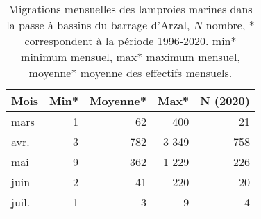 \begin{table}[htbp]
\centering
\begin{tabular}{lrrrr}
  \hline
Mois & Min* & Moyenne* & Max* & N (2020) \\ 
  \hline
mars & 1 & 62 & 400 & 21 \\ 
  avr. & 3 & 782 & 3 349 & 758 \\ 
  mai & 9 & 362 & 1 229 & 226 \\ 
  juin & 2 & 41 & 220 & 20 \\ 
  juil. & 1 & 3 & 9 & 4 \\ 
   \hline
\end{tabular}
\caption{Migrations mensuelles des lamproies marines dans la passe à bassins du barrage d'Arzal, $N$ nombre, * correspondent à
				la période 1996-2020. min* minimum mensuel, max* maximum mensuel, moyenne* moyenne des effectifs mensuels.} 
\label{table_lpm_mois}
\end{table}
